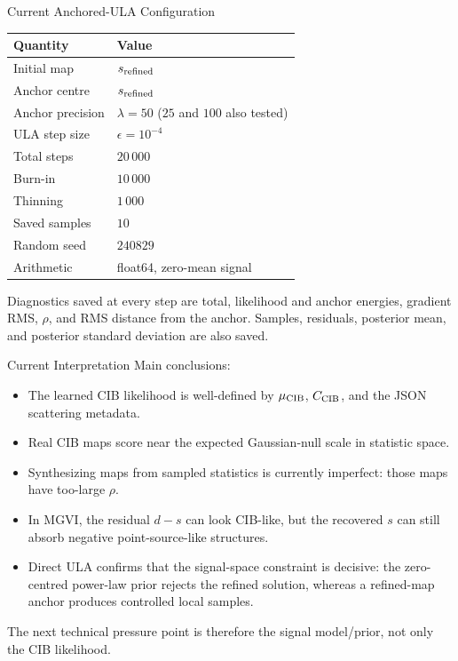 \documentclass[aspectratio=169]{beamer}
\newcommand{\mucib}{\mu_{\rm CIB}}
\newcommand{\Ccib}{C_{\rm CIB}}
\begin{document}
\begin{frame}{Current Anchored-ULA Configuration}
  \begin{center}
  \begin{tabular}{ll}
    \toprule
    Quantity & Value \\
    \midrule
    Initial map & \(s_{\rm refined}\) \\
    Anchor centre & \(s_{\rm refined}\) \\
    Anchor precision & \(\lambda=50\) (\(25\) and \(100\) also tested) \\
    ULA step size & \(\epsilon=10^{-4}\) \\
    Total steps & \(20\,000\) \\
    Burn-in & \(10\,000\) \\
    Thinning & \(1\,000\) \\
    Saved samples & \(10\) \\
    Random seed & \(240829\) \\
    Arithmetic & float64, zero-mean signal \\
    \bottomrule
  \end{tabular}
  \end{center}

  Diagnostics saved at every step are total, likelihood and anchor energies,
  gradient RMS, \(\rho\), and RMS distance from the anchor. Samples, residuals,
  posterior mean, and posterior standard deviation are also saved.
\end{frame}

\begin{frame}{Current Interpretation}
  Main conclusions:

  \vspace{0.2cm}
  \begin{itemize}
    \item The learned CIB likelihood is well-defined by \(\mucib\), \(\Ccib\),
    and the JSON scattering metadata.
    \item Real CIB maps score near the expected Gaussian-null scale in
    statistic space.
    \item Synthesizing maps from sampled statistics is currently imperfect:
    those maps have too-large \(\rho\).
    \item In MGVI, the residual \(d-s\) can look CIB-like, but the recovered
    \(s\) can still absorb negative point-source-like structures.
    \item Direct ULA confirms that the signal-space constraint is decisive:
    the zero-centred power-law prior rejects the refined solution, whereas a
    refined-map anchor produces controlled local samples.
  \end{itemize}

  \vspace{0.35cm}
  The next technical pressure point is therefore the signal model/prior, not
  only the CIB likelihood.
\end{frame}
\end{document}
